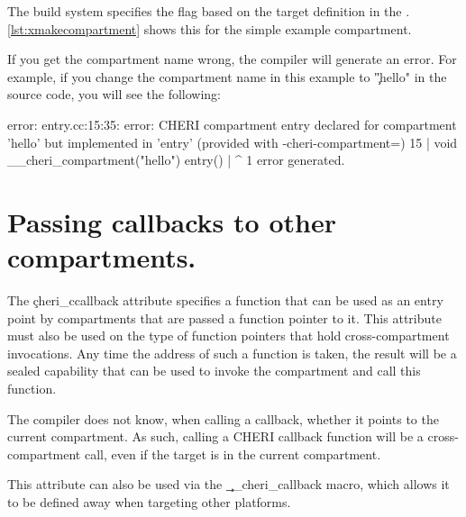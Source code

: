 {{\codelisting[filename=examples/compartment_annotation/compartment.cc,marker=increment,label=lst:incrementfn,caption="The body of a function that is exposed for cross-compartment calls."]{}

The build system specifies the  flag based on the  target definition in the .
\ref{lst:xmakecompartment} shows this for the simple example compartment.

\lualisting[filename=examples/compartment_annotation/xmake.lua,marker=compartment,label=lst:xmakecompartment,caption="Build system code for defining a compartment."]{}

If you get the compartment name wrong, the compiler will generate an error.
For example, if you change the compartment name in this example to \c{"hello"} in the source code, you will see the following:

\begin{console}
error: entry.cc:15:35: error: CHERI compartment entry declared for compartment 'hello' but implemented in 'entry' (provided with -cheri-compartment=)
   15 | void __cheri_compartment("hello") entry()
      |                                   ^
1 error generated.
\end{console}

\section[label=cheri_callback]{Passing callbacks to other compartments.}

The \c{cheri_ccallback} attribute specifies a function that can be used as an entry point by compartments that are passed a function pointer to it.
This attribute must also be used on the type of function pointers that hold cross-compartment invocations.
Any time the address of such a function is taken, the result will be a sealed capability that can be used to invoke the compartment and call this function.

\begin{note}
	The compiler does not know, when calling a callback, whether it points to the current compartment.
	As such, calling a CHERI callback function will  be a cross-compartment call, even if the target is in the current compartment.
\end{note}

This attribute can also be used via the \c{__cheri_callback} macro, which allows it to be defined away when targeting other platforms.

}}
